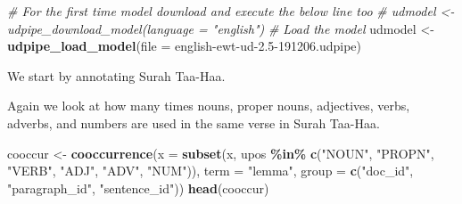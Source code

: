 \documentclass[
]{article}
\newenvironment{Shaded}{\begin{snugshade}}{\end{snugshade}}
\newcommand{\AttributeTok}[1]{\textcolor[rgb]{0.13,0.29,0.53}{#1}}
\newcommand{\CommentTok}[1]{\textcolor[rgb]{0.56,0.35,0.01}{\textit{#1}}}
\newcommand{\DecValTok}[1]{\textcolor[rgb]{0.00,0.00,0.81}{#1}}
\newcommand{\FunctionTok}[1]{\textcolor[rgb]{0.13,0.29,0.53}{\textbf{#1}}}
\newcommand{\NormalTok}[1]{#1}
\newcommand{\OtherTok}[1]{\textcolor[rgb]{0.56,0.35,0.01}{#1}}
\newcommand{\SpecialCharTok}[1]{\textcolor[rgb]{0.81,0.36,0.00}{\textbf{#1}}}
\newcommand{\StringTok}[1]{\textcolor[rgb]{0.31,0.60,0.02}{#1}}
\begin{document}
\footnotesize

\begin{Shaded}
\begin{Highlighting}[]
\CommentTok{\# For the first time model download and execute the below line too}
\CommentTok{\# udmodel \textless{}{-} udpipe\_download\_model(language = "english")}
\CommentTok{\# Load the model}
\NormalTok{udmodel }\OtherTok{\textless{}{-}} \FunctionTok{udpipe\_load\_model}\NormalTok{(}\AttributeTok{file =} \StringTok{\textquotesingle{}english{-}ewt{-}ud{-}2.5{-}191206.udpipe\textquotesingle{}}\NormalTok{)}
\end{Highlighting}
\end{Shaded}

\normalsize

We start by annotating Surah Taa-Haa.

\footnotesize

\begin{Shaded}
\end{Shaded}

\normalsize

Again we look at how many times nouns, proper nouns, adjectives, verbs, adverbs, and numbers are used in the same verse in Surah Taa-Haa.

\footnotesize

\begin{Shaded}
\begin{Highlighting}[]
\NormalTok{cooccur }\OtherTok{\textless{}{-}} \FunctionTok{cooccurrence}\NormalTok{(}\AttributeTok{x =} \FunctionTok{subset}\NormalTok{(x, upos }\SpecialCharTok{\%in\%} \FunctionTok{c}\NormalTok{(}\StringTok{"NOUN"}\NormalTok{, }\StringTok{"PROPN"}\NormalTok{, }\StringTok{"VERB"}\NormalTok{,}
                                                  \StringTok{"ADJ"}\NormalTok{, }\StringTok{"ADV"}\NormalTok{, }\StringTok{"NUM"}\NormalTok{)), }
                     \AttributeTok{term =} \StringTok{"lemma"}\NormalTok{, }
                     \AttributeTok{group =} \FunctionTok{c}\NormalTok{(}\StringTok{"doc\_id"}\NormalTok{, }\StringTok{"paragraph\_id"}\NormalTok{, }\StringTok{"sentence\_id"}\NormalTok{))}
\FunctionTok{head}\NormalTok{(cooccur)}
\end{Highlighting}
\end{Shaded}
\end{document}
